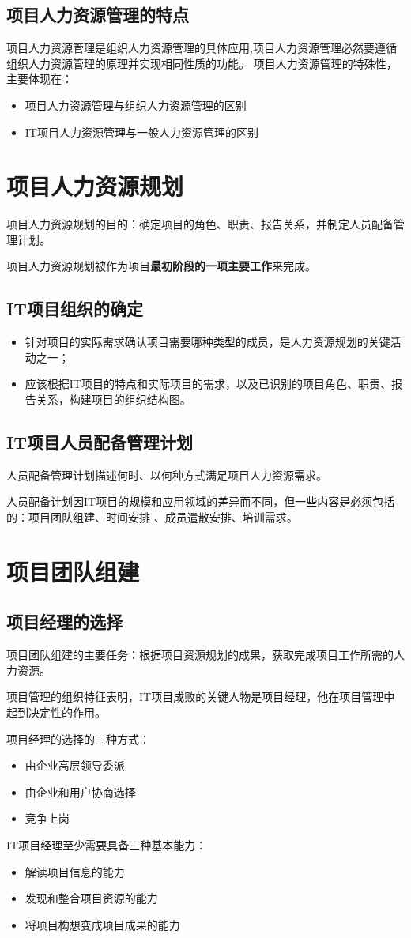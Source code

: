 \subsection{项目人力资源管理的特点}
项目人力资源管理是组织人力资源管理的具体应用,项目人力资源管理必然要遵循组织人力资源管理的原理并实现相同性质的功能。
项目人力资源管理的特殊性，主要体现在：
\begin{itemize}
	\item 项目人力资源管理与组织人力资源管理的区别
	\item IT项目人力资源管理与一般人力资源管理的区别
\end{itemize}
\section{项目人力资源规划}
项目人力资源规划的目的：确定项目的角色、职责、报告关系，并制定人员配备管理计划。
\par 项目人力资源规划被作为项目\textbf{最初阶段的一项主要工作}来完成。
\subsection{IT项目组织的确定}
\begin{itemize}
	\item 针对项目的实际需求确认项目需要哪种类型的成员，是人力资源规划的关键活动之一；
	\item 应该根据IT项目的特点和实际项目的需求，以及已识别的项目角色、职责、报告关系，构建项目的组织结构图。 
\end{itemize}
\subsection{IT项目人员配备管理计划}
人员配备管理计划描述何时、以何种方式满足项目人力资源需求。
\par 人员配备计划因IT项目的规模和应用领域的差异而不同，但一些内容是必须包括的：项目团队组建、时间安排 、成员遣散安排、培训需求。
\section{项目团队组建}
\subsection{项目经理的选择}
项目团队组建的主要任务：根据项目资源规划的成果，获取完成项目工作所需的人力资源。
\par 项目管理的组织特征表明，IT项目成败的关键人物是项目经理，他在项目管理中起到决定性的作用。
\par 项目经理的选择的三种方式：
\begin{itemize}
	\item 由企业高层领导委派
	\item 由企业和用户协商选择
	\item 竞争上岗
\end{itemize}
\par IT项目经理至少需要具备三种基本能力：
\begin{itemize}
	\item 解读项目信息的能力
	\item 发现和整合项目资源的能力
	\item 将项目构想变成项目成果的能力
\end{itemize}
